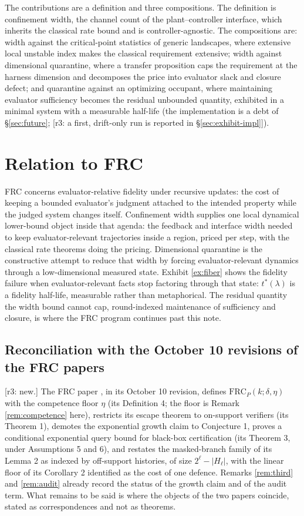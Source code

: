 \documentclass[11pt]{article}
\theoremstyle{definition}
\theoremstyle{remark}
\newcommand{\revnote}[1]{\textcolor{red!60!black}{[r3: #1]}}
\begin{document}
The contributions are a definition and three compositions. The definition is confinement width, the channel count of the plant--controller interface, which inherits the classical rate bound and is controller-agnostic. The compositions are: width against the critical-point statistics of generic landscapes, where extensive local unstable index makes the classical requirement extensive; width against dimensional quarantine, where a transfer proposition caps the requirement at the harness dimension and decomposes the price into evaluator slack and closure defect; and quarantine against an optimizing occupant, where maintaining evaluator sufficiency becomes the residual unbounded quantity, exhibited in a minimal system with a measurable half-life (the implementation is a debt of \S\ref{sec:future}; \revnote{a first, drift-only run is reported in \S\ref{sec:exhibit-impl}}).

\section{Relation to FRC}

FRC concerns evaluator-relative fidelity under recursive updates: the cost of keeping a bounded evaluator's judgment attached to the intended property while the judged system changes itself. Confinement width supplies one local dynamical lower-bound object inside that agenda: the feedback and interface width needed to keep evaluator-relevant trajectories inside a region, priced per step, with the classical rate theorems doing the pricing. Dimensional quarantine is the constructive attempt to reduce that width by forcing evaluator-relevant dynamics through a low-dimensional measured state. Exhibit \ref{ex:fiber} shows the fidelity failure when evaluator-relevant facts stop factoring through that state: $t^*(\lambda)$ is a fidelity half-life, measurable rather than metaphorical. The residual quantity the width bound cannot cap, round-indexed maintenance of sufficiency and closure, is where the FRC program continues past this note.

\subsection{Reconciliation with the October 10 revisions of the FRC papers}\label{sec:frc-reconcile}
\revnote{new.} The FRC paper \cite{dugan2025frc}, in its October 10 revision, defines $\mathrm{FRC}_P(k;\delta,\eta)$ with the competence floor $\eta$ (its Definition 4; the floor is Remark \ref{rem:competence} here), restricts its escape theorem to on-support verifiers (its Theorem 1), demotes the exponential growth claim to Conjecture 1, proves a conditional exponential query bound for black-box certification (its Theorem 3, under Assumptions 5 and 6), and restates the masked-branch family of its Lemma 2 as indexed by off-support histories, of size $2^\ell-|H_\ell|$, with the linear floor of its Corollary 2 identified as the cost of one defence. Remarks \ref{rem:third} and \ref{rem:audit} already record the status of the growth claim and of the audit term. What remains to be said is where the objects of the two papers coincide, stated as correspondences and not as theorems.
\end{document}
